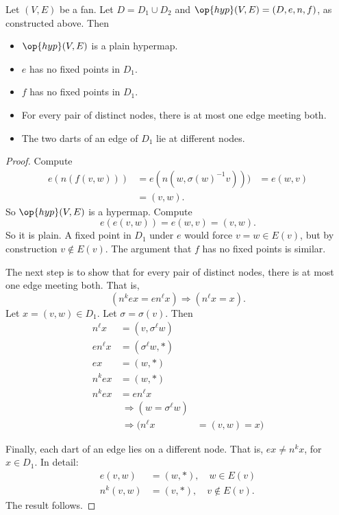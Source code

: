 \begin{lemma}
Let $(V,E)$ be a fan.  Let $D = D_1\cup D_2$
and $\op{hyp}(V,E) = (D,e,n,f)$, as constructed above.  Then
    \begin{itemize}
    \item $\op{hyp}(V,E)$ is a plain hypermap.
    \item  $e$ has no fixed
points in $D_1$.
    \item  $f$ has no fixed points in $D_1$.
    \item For every pair of distinct nodes, there is at most one
    edge meeting both.
    \item The two darts of an edge of $D_1$ lie at different nodes.
    \end{itemize}
%
\end{lemma}

\begin{proof}  Compute
    $$
\begin{array}{lll}
e(n(f(v,w))) &= e(n(w,\sigma(w)^{-1} v))) &=
        e(w,v)\\ 
&= (v,w).
\end{array}
$$
So $\op{hyp}(V,E)$ is a hypermap. Compute
    $$e(e(v,w)) = e(w,v) = (v,w).$$
So it is plain. A fixed point in $D_1$ under $e$ would force $v = w\in E(v)$,
but by construction $v\not\in E(v)$.  The argument that $f$ has no
fixed points is similar.

The next step is to show that for every pair of distinct nodes, there is at most one edge
meeting both.
That is,
        $$(n^k e x = e n^\ell x)\Rightarrow (n^\ell x = x).$$
Let $x = (v,w)\in D_1$.  Let $\sigma=\sigma(v)$. Then
    $$
    \begin{array}{lllllll}
    n^\ell x &= (v,\sigma^\ell w)\\
    e n^\ell x &= (\sigma^\ell w,*)\\
    e x &= (w,*)\\
    n^k e x &= (w,*)\\
    n^k e x &= e n^\ell x \\&\ \Rightarrow (w = \sigma^\ell w) \\&\ \Rightarrow
    (n^\ell x &= (v,w) = x)
    \end{array}
    $$

Finally,  each dart of an edge lies on a different node.
That is, $e x \ne n^k x$, for $x\in D_1$.   In detail:
    $$
    \begin{array}{lll}
        e(v,w) &= (w,*),\quad w\in E(v)\\
        n^k(v,w) &= (v,*),\quad v\not\in E(v).
    \end{array}
    $$
The result follows.
\end{proof}

